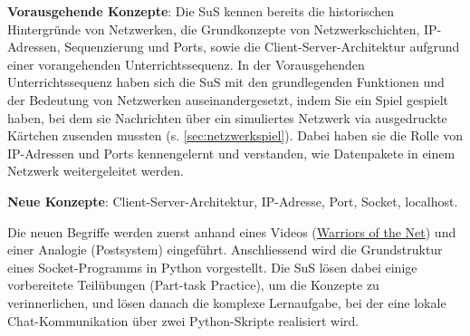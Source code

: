 \begin{scaffoldBox}
    \textbf{Vorausgehende Konzepte}: Die SuS kennen bereits die historischen Hintergründe von Netzwerken, die Grundkonzepte von Netzwerkschichten, IP-Adressen, Sequenzierung und Ports, sowie die Client-Server-Architektur aufgrund einer vorangehenden Unterrichtssequenz. In der Vorausgehenden Unterrichtssequenz haben sich die SuS mit den grundlegenden Funktionen und der Bedeutung von Netzwerken auseinandergesetzt, indem Sie ein Spiel gespielt haben, bei dem sie Nachrichten über ein simuliertes Netzwerk via ausgedruckte Kärtchen zusenden mussten (s. \cref{sec:netzwerkspiel}). Dabei haben sie die Rolle von IP-Adressen und Ports kennengelernt und verstanden, wie Datenpakete in einem Netzwerk weitergeleitet werden.

    \textbf{Neue Konzepte}: Client-Server-Architektur, IP-Adresse, Port, Socket, localhost.

    Die neuen Begriffe werden zuerst anhand eines Videos (\href{https://www.youtube.com/watch?v=PBWhzz_Gn10}{Warriors of the Net}) und einer Analogie (Postsystem) eingeführt. Anschliessend wird die Grundstruktur eines Socket-Programms in Python vorgestellt. Die SuS lösen dabei einige vorbereitete Teilübungen (Part-task Practice), um die Konzepte zu verinnerlichen, und lösen danach die komplexe Lernaufgabe, bei der eine lokale Chat-Kommunikation über zwei Python-Skripte realisiert wird.
\end{scaffoldBox}

